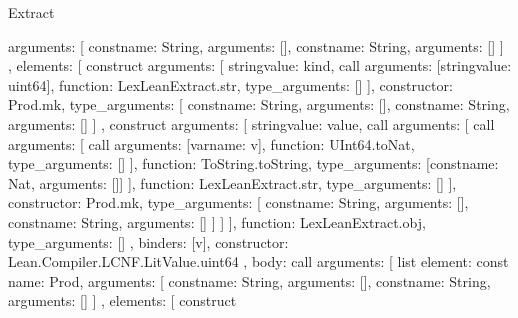 \begin{lexlean}{Extract}
\begin{toolingmodule}
{{{{{{{                    arguments: [
                      const{name: String, arguments: []},
                      const{name: String, arguments: []}
                    ]
                  },
                  elements: [
                    construct{
                      arguments: [
                        string{value: kind},
                        call{
                          arguments: [string{value: uint64}],
                          function: LexLeanExtract.str,
                          type_arguments: []
                        }
                      ],
                      constructor: Prod.mk,
                      type_arguments: [
                        const{name: String, arguments: []},
                        const{name: String, arguments: []}
                      ]
                    },
                    construct{
                      arguments: [
                        string{value: value},
                        call{
                          arguments: [
                            call{
                              arguments: [
                                call{
                                  arguments: [var{name: v}],
                                  function: UInt64.toNat,
                                  type_arguments: []
                                }
                              ],
                              function: ToString.toString,
                              type_arguments: [const{name: Nat, arguments: []}]
                            }
                          ],
                          function: LexLeanExtract.str,
                          type_arguments: []
                        }
                      ],
                      constructor: Prod.mk,
                      type_arguments: [
                        const{name: String, arguments: []},
                        const{name: String, arguments: []}
                      ]
                    }
                  ]
                }
              ],
              function: LexLeanExtract.obj,
              type_arguments: []
            },
            binders: [v],
            constructor: Lean.Compiler.LCNF.LitValue.uint64
          },
          {
            body: call{
              arguments: [
                list{
                  element: const{
                    name: Prod,
                    arguments: [
                      const{name: String, arguments: []},
                      const{name: String, arguments: []}
                    ]
                  },
                  elements: [
                    construct{
}}}}}}}
\end{toolingmodule}
\end{lexlean}
